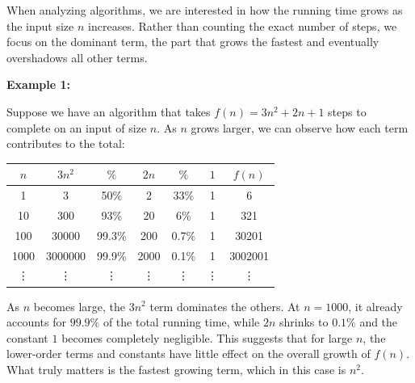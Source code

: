 \documentclass[12pt,a4paper,openany]{article}
\begin{document}
When analyzing algorithms, we are interested in how the running time grows as the input size $n$ increases. 
Rather than counting the exact number of steps, we focus on the dominant term, the part that grows the fastest and eventually overshadows all other terms.

\textbf{Example 1:}

Suppose we have an algorithm that takes $f(n) = 3n^2 + 2n + 1$ steps to complete on an input of size $n$.
As $n$ grows larger, we can observe how each term contributes to the total:

\begin{center}
\begin{tabular}{c|c|c|c|c|c|c}
    $n$ & $3n^2$ & $\%$ & $2n$ & $\%$ & $1$ & $f(n)$ \\
    \hline
    1    & 3       & 50\%   & 2    & 33\%  & 1 & 6       \\
    10   & 300     & 93\%   & 20   & 6\%   & 1 & 321     \\
    100  & 30000   & 99.3\% & 200  & 0.7\% & 1 & 30201   \\
    1000 & 3000000 & 99.9\% & 2000 & 0.1\% & 1 & 3002001 \\
    \vdots & \vdots  & \vdots  & \vdots & \vdots  & \vdots & \vdots
\end{tabular}
\end{center}

As $n$ becomes large, the $3n^2$ term dominates the others. At $n = 1000$, it already accounts for $99.9\%$ of the total running time, while $2n$ shrinks to $0.1\%$ and the constant $1$ becomes completely negligible.
This suggests that for large $n$, the lower-order terms and constants have little effect on the overall growth of $f(n)$. What truly matters is the fastest growing term, which in this case is $n^2$.

\begin{figure}[h]
\centering
{}
\end{figure}
\end{document}
